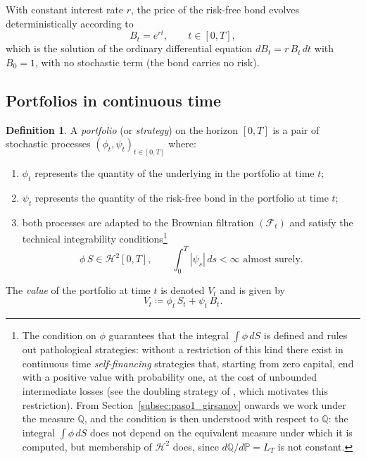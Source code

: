 \documentclass[11pt,a4paper,oneside]{report}
\theoremstyle{plain}
\theoremstyle{definition}
\newtheorem{definicion}[teorema]{Definition}
\theoremstyle{remark}
\newcommand{\PP}{\mathbb{P}}
\newcommand{\Q}{\mathbb{Q}}
\newcommand{\F}{\mathcal{F}}
\newcommand{\1}{\mathbf{1}}
\newcommand{\eqdef}{\coloneqq}
\begin{document}
With constant interest rate
$r$, the price of the risk-free bond evolves deterministically
according to
\begin{equation}\label{eq:bs_bono}
  B_t = e^{rt},
  \qquad t \in [0, T],
\end{equation}
which is the solution of the ordinary differential equation
$dB_t = r\, B_t\, dt$ with $B_0 = 1$, with no stochastic term (the
bond carries no risk).

\subsection{Portfolios in continuous time}
\label{subsec:portfolio_continuo}

\begin{definicion}
\label{def:portfolio_continuo}
A \emph{portfolio} (or \emph{strategy}) on the horizon $[0, T]$ is a
pair of stochastic processes $(\phi_t, \psi_t)_{t \in [0, T]}$ where:
\begin{enumerate}[label=\textnormal{(\roman*)}]
  \item $\phi_t$ represents the quantity of the underlying in the
        portfolio at time $t$;
  \item $\psi_t$ represents the quantity of the risk-free bond in the
        portfolio at time $t$;
  \item both processes are adapted to the Brownian filtration
        $(\F_t)$ and satisfy the technical integrability conditions\footnote{The condition on $\phi$ guarantees that the integral $\int \phi\, dS$ is defined and rules out pathological strategies: without a restriction of this kind there exist in continuous time \emph{self-financing} strategies that, starting from zero capital, end with a positive value with probability one, at the cost of unbounded intermediate losses (see the doubling strategy of \cite[Example~5.1.1]{etheridge}, which motivates this restriction). From Section~\ref{subsec:paso1_girsanov} onwards we work under the measure $\Q$, and the condition is then understood with respect to $\Q$: the integral $\int \phi\, dS$ does not depend on the equivalent measure under which it is computed, but membership of $\mathcal{H}^2$ does, since $d\Q/d\PP = L_T$ is not constant.}
        \begin{equation*}
          \phi\, S \in \mathcal{H}^2[0, T], \qquad
          \int_0^T |\psi_s|\, ds < \infty \text{ almost surely}.
        \end{equation*}
\end{enumerate}
The \emph{value} of the portfolio at time $t$ is denoted $V_t$ and is
given by
\begin{equation}\label{eq:valor_portfolio}
  V_t \eqdef \phi_t\, S_t + \psi_t\, B_t.
\end{equation}
\end{definicion}
\end{document}
